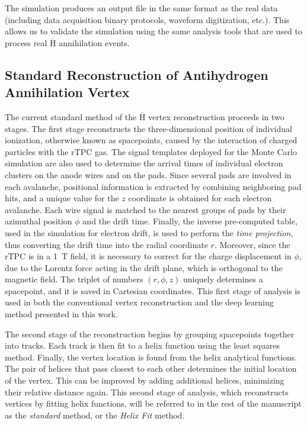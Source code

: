 \documentclass[a4paper,11pt]{article}
\begin{document}
The simulation produces an output file in the same format as the real data (including data acquisition binary protocols, waveform digitization, etc.). This allows us to validate the simulation using the same analysis tools that are used to process real $\overline{\mathrm{H}}$ annihilation events.

\subsection{\label{subsec:helix}Standard Reconstruction of Antihydrogen Annihilation Vertex}

The current standard method of the $\overline{\mathrm{H}}$ vertex reconstruction proceeds in two stages. The first stage reconstructs the three-dimensional position of individual ionization, otherwise known as spacepoints, caused by the interaction of charged particles with the rTPC gas. The signal templates deployed for the Monte Carlo simulation are also used to determine the arrival times of individual electron clusters on the anode wires and on the pads. Since several pads are involved in each avalanche, positional information is extracted by combining neighboring pad hits, and a unique value for the $z$ coordinate is obtained for each electron avalanche. Each wire signal is matched to the nearest groups of pads by their azimuthal position $\phi$ and the drift time. Finally, the inverse pre-computed table, used in the simulation for electron drift, is used to perform the \textit{time projection}, thus converting the drift time into the radial coordinate $r$. Moreover, since the rTPC is in a 1~T field, it is necessary to correct for the charge displacement in $\phi$, due to the Lorentz force acting in the drift plane, which is orthogonal to the magnetic field. The triplet of numbers $(r,\phi,z)$ uniquely determines a spacepoint, and it is saved in Cartesian coordinates. This first stage of analysis is used in both the conventional vertex reconstruction and the deep learning method presented in this work.

The second stage of the reconstruction begins by grouping spacepoints together into tracks. Each track is then fit to a helix function using the least squares method. Finally, the vertex location is found from the helix analytical functions. The pair of helices that pass closest to each other determines the initial location of the vertex. This can be improved by adding additional helices, minimizing their relative distance again. This second stage of analysis, which reconstructs vertices by fitting helix functions, will be referred to in the rest of the manuscript as the \textit{standard} method, or the \textit{Helix Fit} method.
\end{document}
